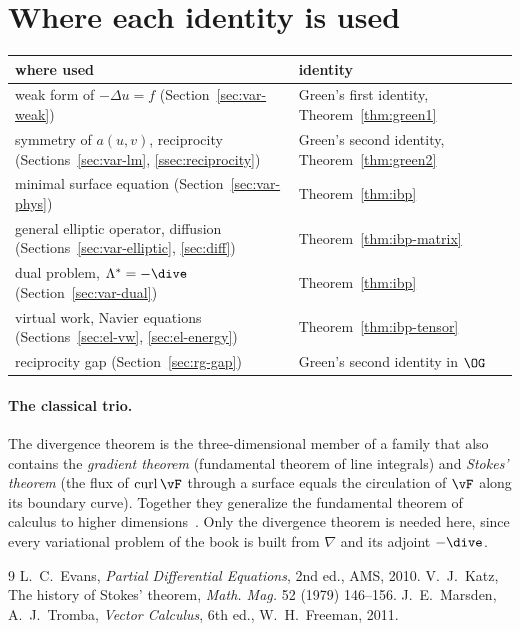 \section{Where each identity is used}
\begin{center}
\renewcommand{\arraystretch}{1.15}
\begin{tabular}{ll}
\toprule
\sffamily where used & \sffamily identity\\
\midrule
weak form of $-\Delta u=f$ (Section~\ref{sec:var-weak}) & Green's first identity, Theorem~\ref{thm:green1}\\
symmetry of $a(u,v)$, reciprocity (Sections~\ref{sec:var-lm}, \ref{ssec:reciprocity}) & Green's second identity, Theorem~\ref{thm:green2}\\
minimal surface equation (Section~\ref{sec:var-phys}) & Theorem~\ref{thm:ibp}\\
general elliptic operator, diffusion (Sections~\ref{sec:var-elliptic}, \ref{sec:diff}) & Theorem~\ref{thm:ibp-matrix}\\
dual problem, $\Lambda^\ast=-\dive$ (Section~\ref{sec:var-dual}) & Theorem~\ref{thm:ibp}\\
virtual work, Navier equations (Sections~\ref{sec:el-vw}, \ref{sec:el-energy}) & Theorem~\ref{thm:ibp-tensor}\\
reciprocity gap (Section~\ref{sec:rg-gap}) & Green's second identity in $\OG$\\
\bottomrule
\end{tabular}
\end{center}

\paragraph{The classical trio.} The divergence theorem is the
three-dimensional member of a family that also contains the \emph{gradient
theorem} (fundamental theorem of line integrals) and \emph{Stokes' theorem}
(the flux of $\operatorname{curl}\vF$ through a surface equals the
circulation of $\vF$ along its boundary curve). Together they generalize the
fundamental theorem of calculus to higher dimensions~\cite{MarsdenTromba2011}.
Only the divergence theorem is needed here, since every variational problem
of the book is built from $\nabla$ and its adjoint $-\dive$.

\begin{chapterbib}{9}
 L.~C.~Evans, \emph{Partial Differential Equations}, 2nd ed., AMS, 2010.
 V.~J.~Katz, The history of Stokes' theorem, \emph{Math. Mag.} 52 (1979) 146--156.
 J.~E.~Marsden, A.~J.~Tromba, \emph{Vector Calculus}, 6th ed., W.~H.~Freeman, 2011.
\end{chapterbib}
